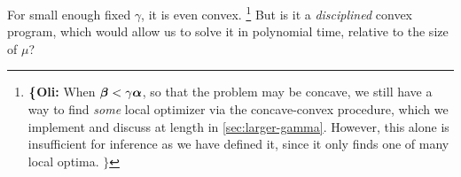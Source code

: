 \documentclass[twoside]{article}
\newcommand\voli[1]{{\color{olicolor}\textbf{$\boldsymbol\{$Oli: }#1 \textbf{$\boldsymbol\}$}}}
\begin{document}
For small enough fixed $\gamma$,
it is even convex.%
\footnote{
    \voli{When $\boldsymbol\beta < \gamma \boldsymbol\alpha$,
    so that the problem may be concave,
    we still have a way to find \emph{some} local optimizer via the concave-convex procedure, which we implement and discuss at length in \cref{sec:larger-gamma}.
    However, this alone is insufficient for inference as we have defined it,
    since it only finds one of many local optima. }
    }
But is it a \emph{disciplined} convex program, which would allow us to solve it in polynomial time, relative to the size of $\mu$?
% 
\end{document}
